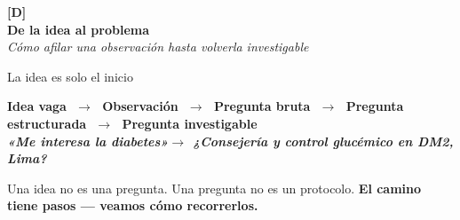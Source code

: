 \documentclass[12pt, aspectratio=169]{beamer}
\begin{document}
\begin{frame}[plain]
  \vfill
  \centering
  \begin{tcolorbox}[colback=sfPrimary, colframe=sfPrimary,
                    width=0.72\textwidth, arc=4pt, boxrule=0pt,
                    left=12pt, right=12pt, top=10pt, bottom=10pt]
    \centering
    \color{white}
    \large\textbf{[D]}\\[4pt]
    \Large\textbf{De la idea al problema}\\[8pt]
    \normalsize\textit{Cómo afilar una observación hasta volverla investigable}
  \end{tcolorbox}
  \vfill
\end{frame}


\begin{frame}{La idea es solo el inicio}
  \begin{center}
    \small\bfseries
    Idea vaga
    $\;\longrightarrow\;$
    Observación
    $\;\longrightarrow\;$
    Pregunta bruta
    $\;\longrightarrow\;$
    Pregunta estructurada
    $\;\longrightarrow\;$
    {\color{sfPrimary}Pregunta investigable}\\[6pt]
    {\normalfont\footnotesize\textit{%
      «Me interesa la diabetes»\quad$\longrightarrow$\quad%
      ¿Consejería y control glucémico en DM2, Lima?}}
  \end{center}

  \medskip
  \begin{keybox}
    \small
    Una idea no es una pregunta. Una pregunta no es un protocolo.
    \textbf{El camino tiene pasos — veamos cómo recorrerlos.}
  \end{keybox}
\end{frame}
\end{document}
